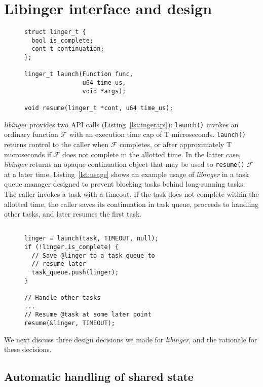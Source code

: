 \section{Libinger interface and design}

\begin{figure}
\begin{lstlisting}[label=lst:ingerapi,caption=Preemptible functions interface]
struct linger_t {
  bool is_complete;
  cont_t continuation;
};

linger_t launch(Function func,
                u64 time_us,
                void *args);

void resume(linger_t *cont, u64 time_us);
\end{lstlisting}
\end{figure}

\textit{libinger} provides two API calls (Listing~\ref{lst:ingerapi}): \texttt{launch()}
invokes an ordinary function $\mathcal{F}$ with an execution time cap of T
microseconds. \texttt{launch()} returns control to the caller when $\mathcal{F}$
completes,
or after approximately T microseconds if $\mathcal{F}$ does not complete in the
allotted time. In the latter case, \textit{libinger} returns an opaque
continuation object that may be used to \texttt{resume()} $\mathcal{F}$ at a
later time. Listing~\ref{lst:usage} shows an example usage of \textit{libinger}
in a task queue manager designed to prevent blocking tasks behind long-running
tasks. The caller invokes a task with a timeout. If the task does not complete
within the allotted time, the caller saves its continuation in task queue,
proceeds to handling other tasks, and later resumes the first task. 

\begin{figure}
\begin{lstlisting}[label=lst:usage, caption=Preemptible function usage example]

linger = launch(task, TIMEOUT, null);
if (!linger.is_complete) {
  // Save @linger to a task queue to
  // resume later
  task_queue.push(linger);
}

// Handle other tasks
...
// Resume @task at some later point
resume(&linger, TIMEOUT);

\end{lstlisting}
\end{figure}

We next discuss three design decisions we made for \textit{libinger}, and the
rationale for these decisions.

\subsection{Automatic handling of shared state}

